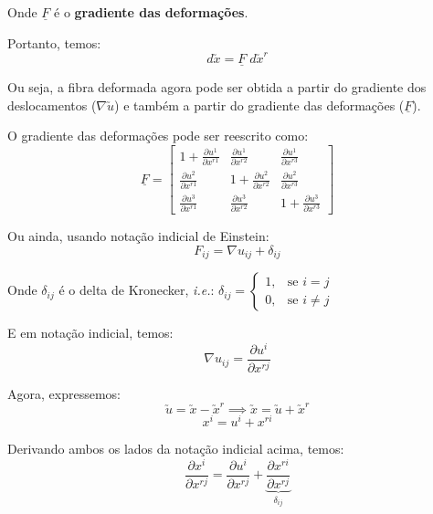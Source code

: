 \documentclass[12pt, a4paper]{article}
\begin{document}
	Onde $\underline{F}$ é o \textbf{gradiente das deformações}.
	
	Portanto, temos:
	\begin{equation}
	d\utilde{x}=\underline{F}\;d\utilde{x}^r
	\end{equation}
	
	Ou seja, a fibra deformada agora pode ser obtida a partir do gradiente dos deslocamentos ($\nabla\utilde{u}$) e também a partir do gradiente das deformações ($\underline{F}$).
	
	O gradiente das deformações pode ser reescrito como:
	\[
	\underline{F}=
	\begin{bmatrix}
		1+\frac{\partial u^1}{\partial x^{r1}} & \frac{\partial u^1}{\partial x^{r2}} & \frac{\partial u^1}{\partial x^{r3}} \\
		\frac{\partial u^2}{\partial x^{r1}} & 1+\frac{\partial u^2}{\partial x^{r2}} & \frac{\partial u^2}{\partial x^{r3}} \\
		\frac{\partial u^3}{\partial x^{r1}} & \frac{\partial u^3}{\partial x^{r2}} & 1+\frac{\partial u^3}{\partial x^{r3}}
	\end{bmatrix}
	\]
	
	Ou ainda, usando notação indicial de Einstein:
	\[F_{ij}=\nabla u_{ij}+\delta_{ij}\]
	
	Onde $\delta_{ij}$ é o delta de Kronecker, \textit{i.e.}: $\delta_{ij}=\begin{cases} 1, & \text{se } i=j \\ 0, & \text{se } i\neq j \end{cases}$
	
	E em notação indicial, temos:
	\[\nabla u_{ij}=\frac{\partial u^i}{\partial x^{rj}}\]
	
	Agora, expressemos:
	\[\utilde{u}=\utilde{x}-\utilde{x}^r\implies \utilde{x}=\utilde{u}+\utilde{x}^r\]
	\[x^i=u^i+x^{ri}\]
	
	Derivando ambos os lados da notação indicial acima, temos:
	\[\frac{\partial x^i}{\partial x^{rj}}=\frac{\partial u^i}{\partial x^{rj}}+\underbrace{\frac{\partial x^{ri}}{\partial x^{rj}}}_{\displaystyle\delta_{ij}}\]
	
\end{document}
